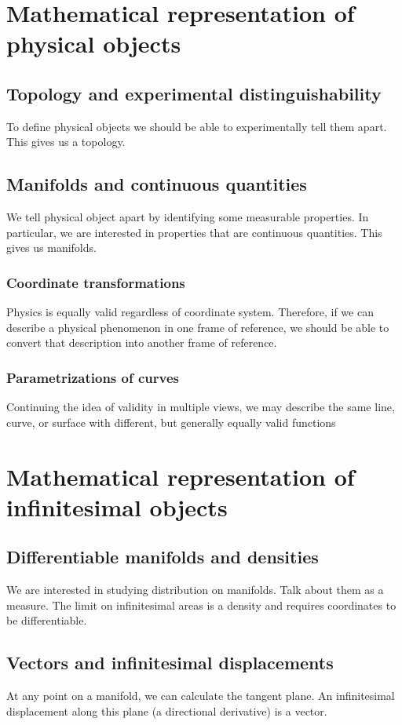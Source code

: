 \documentclass{book}
\begin{document}
\tableofcontents

\chapter{Mathematical representation of physical objects}

\section{Topology and experimental distinguishability}
To define physical objects we should be able to experimentally tell them apart. This gives us a topology.

\section{Manifolds and continuous quantities}
We tell physical object apart by identifying some measurable properties. In particular, we are interested in properties that are continuous quantities. This gives us manifolds.

\subsection{Coordinate transformations}
Physics is equally valid regardless of coordinate system. Therefore, if we can describe a physical phenomenon in one frame of reference, we should be able to convert that description into another frame of reference. 
\subsection{Parametrizations of curves}
Continuing the idea of validity in multiple views, we may describe the same line, curve, or surface with different, but generally equally valid functions
\chapter{Mathematical representation of infinitesimal objects}

\section{Differentiable manifolds and densities}
We are interested in studying distribution on manifolds. Talk about them as a measure. The limit on infinitesimal areas is a density and requires coordinates to be differentiable.

\section{Vectors and infinitesimal displacements}
At any point on a manifold, we can calculate the tangent plane. An infinitesimal displacement along this plane (a directional derivative) is a vector. 
\end{document}
